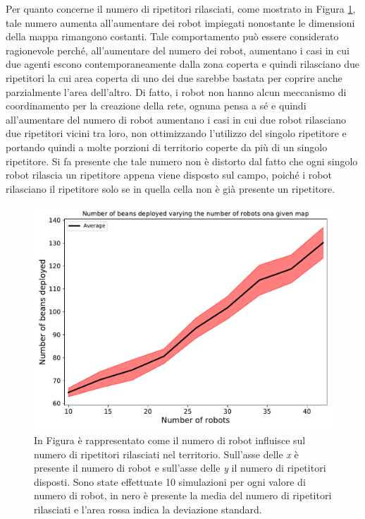 Per quanto concerne il numero di ripetitori rilasciati, come mostrato in Figura \ref{fig:robotsbeans}, tale numero aumenta all'aumentare dei robot impiegati nonostante le dimensioni della mappa rimangono costanti.
Tale comportamento può essere considerato ragionevole perché, all'aumentare del numero dei robot, aumentano i casi in cui due agenti escono contemporaneamente dalla zona coperta e quindi rilasciano due ripetitori la cui area coperta di uno dei due sarebbe bastata per coprire anche parzialmente l'area dell'altro.
Di fatto, i robot non hanno alcun meccanismo di coordinamento per la creazione della rete, ognuna pensa a sé e quindi all'aumentare del numero di robot aumentano i casi in cui due robot rilasciano due ripetitori vicini tra loro, non ottimizzando l'utilizzo del singolo ripetitore e portando quindi a molte porzioni di territorio coperte da più di un singolo ripetitore.
Si fa presente che tale numero non è distorto dal fatto che ogni singolo robot rilascia un ripetitore appena viene disposto sul campo, poiché i robot rilasciano il ripetitore solo se in quella cella non è già presente un ripetitore.\\
\begin{figure}
	\centering
	\includegraphics[width=0.9\linewidth]{images/macro_results/robots_beans}
	\caption{In Figura è rappresentato come il numero di robot influisce sul numero di ripetitori rilasciati nel territorio. Sull'asse delle \textit{x} è presente il numero di robot e sull'asse delle \textit{y} il numero di ripetitori disposti. Sono state effettuate 10 simulazioni per ogni valore di numero di robot, in nero è presente la media del numero di ripetitori rilasciati e l'area rossa indica la deviazione standard.}
	\label{fig:robotsbeans}
\end{figure}

